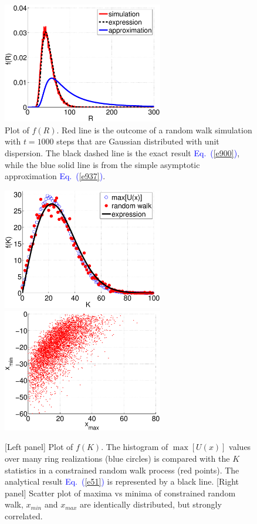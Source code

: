 \documentclass[aps,prl,floats,floatfix,twocolumn]{revtex4}
\newcommand{\Eq}[1]{\textcolor{blue}{Eq.\!\!~(\ref{#1})}}
\begin{document}
\begin{figure}[H!]

\includegraphics[width=7cm]{PB_sim.eps}

\caption{
Plot of $f(R)$. Red line is the outcome of a random walk simulation with ${t=1000}$ 
steps that are Gaussian distributed with unit dispersion.   
The black dashed line is the exact result \Eq{e900}, 
while the blue solid line is from the simple asymptotic approximation \Eq{e937}.} 

\label{fb}
\end{figure}


\begin{figure}[H!]
\includegraphics[width=7cm]{f_K.eps} 
\includegraphics[width=7cm]{MinMax.eps} 

\caption{
[Left panel] Plot of $f(K)$. 
The histogram of $\max[U(x)]$ values over many ring realizations (blue circles)  
is compared with the $K$ statistics in a constrained random walk process (red points).
The analytical result \Eq{e51} is represented by a black line.
[Right panel] Scatter plot of maxima vs minima of constrained random walk, $x_{min}$ and $x_{max}$ are identically distributed, but strongly correlated. }

\label{pu}
\end{figure}



\clearpage
\end{document}
